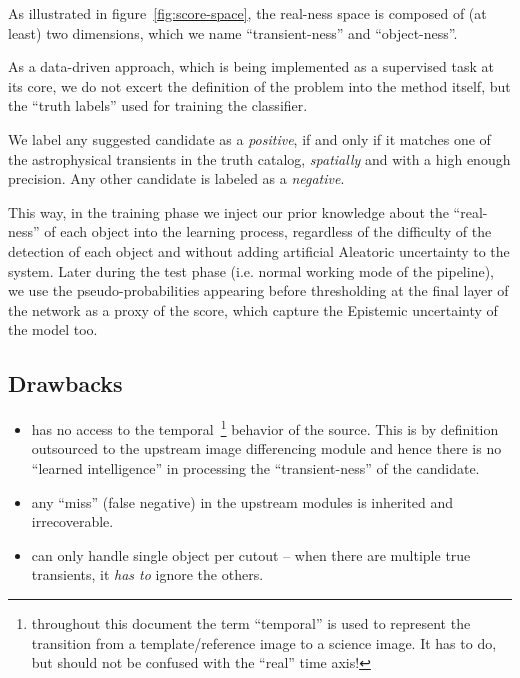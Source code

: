 As illustrated in figure~\ref{fig:score-space}, the real-ness space is composed of (at least) two dimensions, which we name ``transient-ness'' and ``object-ness''.

As a data-driven approach, which is being implemented as a supervised task at its core, we do not excert the definition of the problem into the method itself, but the ``truth labels'' used for training the classifier.
\begin{tcolorbox}
We label any suggested candidate as a \emph{positive}, if and only if it matches one of the astrophysical transients in the truth catalog, \emph{spatially} and with a high enough precision. Any other candidate is labeled as a \emph{negative}.
\end{tcolorbox}

This way, in the training phase we inject our prior knowledge about the ``real-ness'' of each object into the learning process, regardless of the difficulty of the detection of each object and without adding artificial Aleatoric uncertainty to the system. Later during the test phase (i.e. normal working mode of the pipeline), we use the pseudo-probabilities appearing before thresholding at the final layer of the network as a proxy of the score, which capture the Epistemic uncertainty of the model too.





\subsection{Drawbacks}
\begin{itemize}
\item has no access to the temporal~\footnote{throughout this document the term ``temporal'' is used to represent the transition from a template/reference image to a science image. It has to do, but should not be confused with the ``real'' time axis!} behavior of the source. This is by definition outsourced to the upstream image differencing module and hence there is no ``learned intelligence'' in processing the ``transient-ness'' of the candidate.
\item any ``miss'' (false negative) in the upstream modules is inherited and irrecoverable.
\item can only handle single object per cutout -- when there are multiple true transients, it \emph{has to} ignore the others.
\end{itemize}

